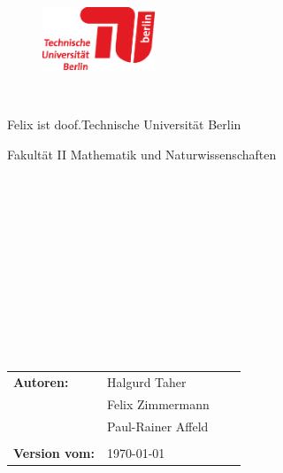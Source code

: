 


%


\thispagestyle{empty}

\begin{figure}[t]

 \includegraphics[width=0.3\textwidth]{abb/misc/TULogo.eps}
~~~~~~~~~~
\end{figure}


\begin{verbatim}


\end{verbatim}

\begin{center}
\Large{Felix ist doof.Technische Universit\"at Berlin}\\
\end{center}


\begin{center}
\Large{Fakult\"at II Mathematik und Naturwissenschaften}
\end{center}
\begin{verbatim}


\end{verbatim}
\begin{center}
\doublespacing
\textbf{\LARGE{\titleDocument}}\\
\singlespacing
\begin{verbatim}

\end{verbatim}
\textbf{{~\subjectDocument}}
\end{center}
\begin{verbatim}

\end{verbatim}
\begin{center}

\end{center}
\begin{verbatim}





\end{verbatim}
\begin{flushleft}
\begin{tabular}{llll}
\textbf{Autoren:} &  Halgurd Taher &\\& Felix Zimmermann& \\
&  Paul-Rainer Affeld & \\
& & \\
\textbf{Version vom:}  & \today &
\end{tabular}
\end{flushleft}